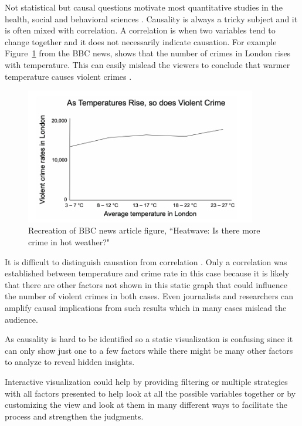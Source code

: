 Not statistical but causal questions motivate most quantitative studies in the health, social and behavioral sciences \cite{pearl2011science}. Causality is always a tricky subject and it is often mixed with correlation. A correlation is when two variables tend to change together and it does not necessarily indicate causation. For example Figure~\ref{fig:temp} from the BBC news, shows that the number of crimes in London rises with temperature. This can easily mislead the viewers to conclude that warmer temperature causes violent crimes \cite{matute2015illusions}.

\begin{figure}[H]
\centering
\captionsetup{justification=centering}
\includegraphics[width=0.9\textwidth]{Report-latex/tex_files/pics/casual1.png}
\caption{Recreation of BBC news article figure, ``Heatwave: Is there more crime in hot weather?"\cite{matute2015illusions} }
\label{fig:temp}
\end{figure}


It is difficult to distinguish causation from correlation \cite{rothman2012epidemiology}. Only a correlation was established between temperature and crime rate in this case because it is likely that there are other factors not shown in this static graph that could influence the number of violent crimes in both cases. Even journalists and researchers can amplify causal implications from such results which in many cases mislead the audience. 

As causality is hard to be identified so a static visualization is confusing since it can only show just one to a few factors while there might be many other factors to analyze to reveal hidden insights. 

Interactive visualization could help by providing filtering or multiple strategies with all factors presented to help look at all the possible variables together or by customizing the view and look at them in many different ways to facilitate the process and strengthen the judgments. 

